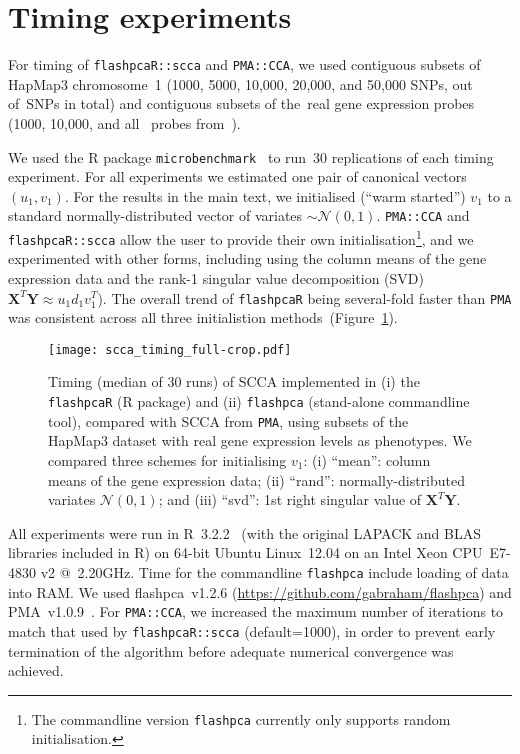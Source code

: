 \documentclass[a4paper,10pt]{article}
\begin{document}
\section{Timing experiments}

For timing of \texttt{flashpcaR::scca} and \texttt{PMA::CCA}, we used
contiguous subsets of HapMap3 chromosome~1 (1000, 5000, 10,000, 20,000,
and 50,000 SNPs, out of~\ngenes SNPs in total) and contiguous subsets of
the~\ngenes real gene expression probes (1000, 10,000, and all~\ngenes
probes from~\citep{Stranger2012}).

We used the \textsf{R} package \texttt{microbenchmark}~\citep{Mersmann2015}
to run~30 replications of each timing experiment.  For all
experiments we estimated one pair of canonical vectors $(u_1,
v_1)$.  For the results in the main text, we initialised (``warm
started'') $v_1$ to a standard normally-distributed vector of variates
$\sim\mathcal{N}(0,1)$. \texttt{PMA::CCA} and \texttt{flashpcaR::scca}
allow the user to provide their own initialisation\footnote{The commandline
version \texttt{flashpca} currently only supports random initialisation.},
and we experimented with other forms, including using the column means
of the gene expression data and the rank-1 singular value decomposition
(SVD) $\mathbf{X}^T \mathbf{Y} \approx u_1 d_1 v_1^T$). The overall trend of
\texttt{flashpcaR} being several-fold faster than \texttt{PMA} was consistent
across all three initialistion methods~(Figure~\ref{fig:s01}).

\begin{figure}[!tpb]
\centering
\texttt{[image: scca\_timing\_full-crop.pdf]}
\caption{
Timing (median of 30 runs) of SCCA implemented in (i) the \texttt{flashpcaR}
(\textsf{R} package) and (ii) \texttt{flashpca} (stand-alone commandline tool),
compared with SCCA from \texttt{PMA}, using subsets of the HapMap3 dataset with real
gene expression levels as phenotypes. We compared three schemes for initialising
$v_1$: (i) ``mean'': column means of the gene expression data; (ii) ``rand'':
normally-distributed variates $\mathcal{N}(0, 1)$; and (iii) ``svd'': 1st
right singular value of $\mathbf{X}^T \mathbf{Y}$.
}
\label{fig:s01}
\end{figure}

All experiments were run in \textsf{R}~3.2.2~\citep{R} (with the original
LAPACK and BLAS libraries included in \textsf{R}) on 64-bit Ubuntu Linux~12.04
on an Intel Xeon CPU~E7-4830 v2 @~2.20GHz. Time for the commandline
\texttt{flashpca} include loading of data into RAM. We used flashpca~v1.2.6
(\url{https://github.com/gabraham/flashpca}) and PMA~v1.0.9~\citep{Witten2013}.
For \texttt{PMA::CCA}, we increased the maximum number of iterations to match
that used by \texttt{flashpcaR::scca} (default=1000), in order to prevent
early termination of the algorithm before adequate numerical convergence was
achieved. 
\end{document}
